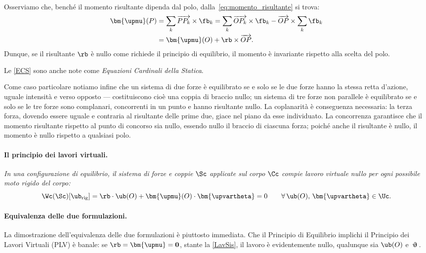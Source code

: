 \medskip

Osserviamo che, benché il momento risultante dipenda dal polo, 
dalla~\eqref{eq:momento_risultante}
si trova:
\begin{equation}\label{eq:variazione_momento}
	\begin{aligned}
		\bm{\upmu}(P)
	&= \sum_k \overrightarrow{PP_k} \times \fb_k
	= \sum_k \overrightarrow{OP_k} \times \fb_k
	- \overrightarrow{OP} \times \sum_k \fb_k\\
	&= \bm{\upmu}(O) + \rb \times \overrightarrow{OP}.
	\end{aligned}
\end{equation}
Dunque, se il risultante $\rb$ è nullo come richiede il principio di equilibrio, il momento è invariante rispetto alla scelta del polo.

Le \eqref{ECS} sono anche note come \textit{Equazioni Cardinali della Statica}.

Come caso particolare notiamo infine che un sistema di due forze è
equilibrato se e solo se le due forze hanno la stessa retta
d'azione, uguale intensità e verso opposto --- costituiscono
cioè una coppia di braccio nullo; un sistema di tre forze non
parallele è equilibrato se e solo se le tre forze sono
complanari, concorrenti in un punto e hanno risultante nullo.
La coplanarità è conseguenza necessaria: la terza forza,
dovendo essere uguale e contraria al risultante delle prime
due, giace nel piano da esse individuato. La concorrenza
garantisce che il momento risultante rispetto al punto di
concorso sia nullo, essendo nullo il braccio di ciascuna
forza; poiché anche il risultante è nullo, il momento è nullo
rispetto a qualsiasi polo.


\paragraph{Il principio dei lavori virtuali.}
\textit{In una configurazione di equilibrio, il sistema di forze e coppie $\Sc$ applicate sul corpo $\Cc$ compie lavoro virtuale nullo
per ogni possibile moto rigido del corpo:}
	\begin{equation}\label{eq:PLV}
	\Wc(\Sc)[\ub_{\rm rig}] = \rb \cdot \ub(O)
	+ \bm{\upmu}(O) \cdot \bm{\upvartheta} = 0
	\qquad \forall\,\ub(O),\,\bm{\upvartheta}\in \Uc.
\end{equation}



\paragraph{Equivalenza delle due formulazioni.}
La dimostrazione dell'equivalenza delle due formulazioni è piuttosto immediata. 
Che il Principio di Equilibrio implichi il Principio dei Lavori Virtuali (PLV) è banale:
se $\rb=\bm{\upmu}=\mathbf{0}$, stante la \eqref{LavSis}, il lavoro è evidentemente nullo, qualunque sia $\ub(O)$ e $\bm{\upvartheta}$.

